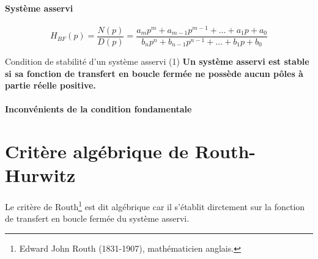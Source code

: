 \paragraph{Système asservi}
\begin{center}
    
\end{center}
\[
H_{BF}(p)=\dfrac{N(p)}{D(p)}=\dfrac{a_mp^m+a_{m-1}p^{m-1}+\ldots+a_1p+a_0}
                                   {b_np^n+b_{n-1}p^{n-1}+\ldots+b_1p+b_0}
\]
\begin{criteria}{Condition de stabilité d'un système asservi (1)}
    \textbf{Un système asservi est stable si sa fonction de transfert en 
            boucle fermée ne possède aucun pôles à partie réelle positive.}
\end{criteria}
\paragraph{Inconvénients de la condition fondamentale}

\section{Critère algébrique de Routh-Hurwitz
}

Le critère de Routh\footnote{Edward John Routh 
(1831-1907), mathématicien anglais.} est dit algébrique car il s'établit 
dirctement sur la fonction de transfert en boucle fermée du système asservi. 

